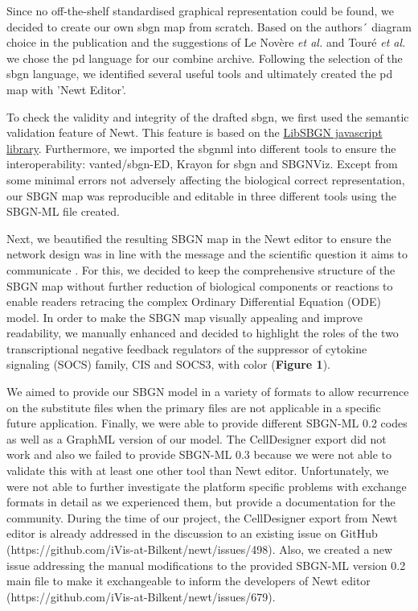 Since no off-the-shelf standardised graphical representation could be found, we decided to create our own \ac{sbgn} map from scratch. Based on the authors´ diagram choice in the publication and the suggestions of Le Novère \textit{et al.} \cite{sbgnnovere} and Touré \textit{et al.} \cite{sbgntoure} we chose the \ac{pd} language for our \ac{combine} archive. Following the selection of the \ac{sbgn} language, we identified several useful tools and ultimately created the \ac{pd} map with 'Newt Editor'. 

To check the validity and integrity of the drafted \ac{sbgn}, we first used the semantic validation feature of Newt. This feature is based on the \hyperlink{https://github.com/sbgn/libsbgn}{LibSBGN javascript library}\cite{van2012software}. Furthermore, we imported the \ac{sbgnml} into different tools to ensure the interoperability: \acs{vanted}/\acs{sbgn}-ED, Krayon for \ac{sbgn} and SBGNViz. Except from some minimal errors not adversely affecting the biological correct representation, our SBGN map was reproducible and editable in three different tools using the SBGN-ML file created.

Next, we beautified the resulting SBGN map in the Newt editor to ensure the network design was in line with the message and the scientific question it aims to communicate \cite{sbgntoure}.  For this, we decided to keep the comprehensive structure of the SBGN map without further reduction of biological components or reactions to enable readers retracing the complex Ordinary Differential Equation (ODE) model. In order to make the SBGN map visually appealing and improve readability, we manually enhanced and decided to highlight the roles of the two transcriptional negative feedback regulators of the suppressor of cytokine signaling (SOCS) family, CIS and SOCS3, with color (\textbf{Figure 1}). 

We aimed to provide our SBGN model in a variety of formats to allow recurrence on the substitute files when the primary files are not applicable in a specific future application. Finally, we were able to provide different SBGN-ML 0.2 codes as well as a GraphML version of our model. The CellDesigner export did not work and also we failed to provide SBGN-ML 0.3 because we were not able to validate this with at least one other tool than Newt editor. Unfortunately, we were not able to further investigate the platform specific problems with exchange formats in detail as we experienced them, but provide a documentation for the community. During the time of our project, the CellDesigner export from Newt editor is already addressed in the discussion to an existing issue on GitHub (https://github.com/iVis-at-Bilkent/newt/issues/498). Also, we created a new issue addressing the manual modifications to the provided SBGN-ML version 0.2 main file to make it exchangeable to inform the developers of Newt editor (https://github.com/iVis-at-Bilkent/newt/issues/679).

